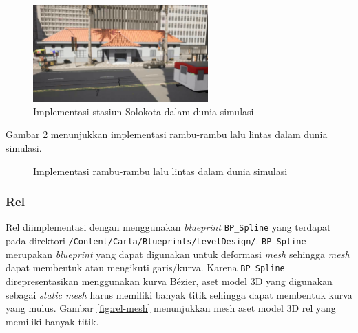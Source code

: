 \begin{figure}[!h]
    \centering
    \includegraphics[width=0.6\textwidth]{resources/chapter-4/stasiun-solokota-carla.png}
    \caption{Implementasi stasiun Solokota dalam dunia simulasi}
    \label{fig:stasiun-solokota}
\end{figure}

Gambar \ref{fig:road-signs} menunjukkan implementasi rambu-rambu lalu lintas
dalam dunia simulasi.

\begin{figure}[!h]
    \centering
    \hfill
    \caption{Implementasi rambu-rambu lalu lintas dalam dunia simulasi}
    \label{fig:road-signs}
\end{figure}

\subsubsection{Rel}

Rel diimplementasi dengan menggunakan \textit{blueprint} \verb|BP_Spline| yang
terdapat pada direktori \verb|/Content/Carla/Blueprints/LevelDesign/|.
\verb|BP_Spline| merupakan \textit{blueprint} yang dapat digunakan untuk
deformasi \textit{mesh} sehingga \textit{mesh} dapat membentuk atau mengikuti
garis/kurva. Karena \verb|BP_Spline| direpresentasikan menggunakan kurva Bézier,
aset model 3D yang digunakan sebagai \textit{static mesh} harus memiliki banyak
titik sehingga dapat membentuk kurva yang mulus. Gambar \ref{fig:rel-mesh}
menunjukkan mesh aset model 3D rel yang memiliki banyak titik.

